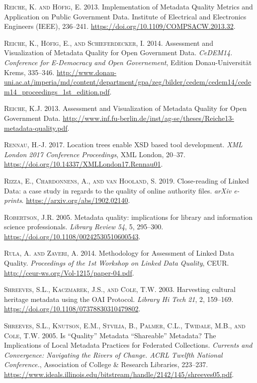 \textsc{Reiche, K. and Höfig, E.} 2013. Implementation of Metadata Quality Metrics and Application on Public Government Data. Institute of Electrical and Electronics Engineers (IEEE), 236–241. \url{https://doi.org/10.1109/COMPSACW.2013.32}.

\textsc{Reiche, K., Höfig, E., and Schieferdecker, I.} 2014. Assessment and Visualization of Metadata Quality for Open Government Data. \emph{CeDEM14. Conference for E-Democracy and Open Governement}, Edition Donau-Universität Krems, 335–346. \url{http://www.donau-uni.ac.at/imperia/md/content/department/gpa/zeg/bilder/cedem/cedem14/cedem14_proceedings_1st_edition.pdf}.

\textsc{Reiche, K.J.} 2013. Assessment and Visualization of Metadata Quality for Open Government Data. \url{http://www.inf.fu-berlin.de/inst/ag-se/theses/Reiche13-metadata-quality.pdf}.

\textsc{Rennau, H.-J.} 2017. Location trees enable XSD based tool development. \emph{XML London 2017 Conference Proceedings}, XML London, 20–37. \url{https://doi.org/10.14337/XMLLondon17.Rennau01}.

\textsc{Rizza, E., Chardonnens, A., and van Hooland, S.} 2019. Close-reading of Linked Data: a case study in regards to the quality of online authority files. \emph{arXiv e-prints}. \url{https://arxiv.org/abs/1902.02140}.

\textsc{Robertson, J.R.} 2005. Metadata quality: implications for library and information science professionals. \emph{Library Review} \emph{54}, 5, 295–300. \url{https://doi.org/10.1108/00242530510600543}.

\textsc{Rula, A. and Zaveri, A.} 2014. Methodology for Assessment of Linked Data Quality. \emph{Proceedings of the 1st Workshop on Linked Data Quality}, CEUR. \url{http://ceur-ws.org/Vol-1215/paper-04.pdf}.

\textsc{Shreeves, S.L., Kaczmarek, J.S., and Cole, T.W.} 2003. Harvesting cultural heritage metadata using the OAI Protocol. \emph{Library Hi Tech} \emph{21}, 2, 159–169. \url{https://doi.org/10.1108/07378830310479802}.

\textsc{Shreeves, S.L., Knutson, E.M., Stvilia, B., Palmer, C.L., Twidale, M.B., and Cole, T.W.} 2005. Is “Quality” Metadata “Shareable” Metadata? The Implications of Local Metadata Practices for Federated Collections. \emph{Currents and Convergence: Navigating the Rivers of Change. ACRL Twelfth National Conference.}, Association of College \& Research Libraries, 223–237. \url{https://www.ideals.illinois.edu/bitstream/handle/2142/145/shreeves05.pdf}.

